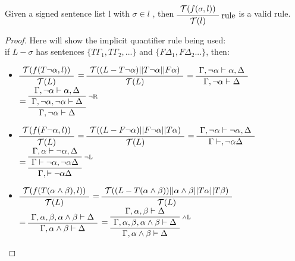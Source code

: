 \documentclass[runningheads]{llncs}
\begin{document}
\begin{theorem}
     Given a signed sentence list l with $\sigma \in l$ , then 
    $\RightLabel{rule}\AxiomC{$\mathcal{T}( f(\sigma,l))$}\UnaryInfC{$\mathcal{T}(l)$}\DisplayProof$ 
    is a valid rule.

\end{theorem}

\begin{proof}
    Here will show the implicit quantifier rule being used:\\ 
    if $L-\sigma$ has sentences $\{ T\Gamma_{1}, T\Gamma_{2}, ...\}$ and  $ \{F\Delta_1, F\Delta_2 ...\} $, then: 
    \small{
    \begin {itemize}

    \item
    $\AxiomC{$\mathcal{T}( f(T\neg \alpha,l))$}\UnaryInfC{$\mathcal{T}(L)$}\DisplayProof$ 
    $=\AxiomC{$\mathcal{T}( (L-T\neg \alpha)||T \neg \alpha||F \alpha)$}\UnaryInfC{$\mathcal{T}(L)$}\DisplayProof$
    $=\AxiomC{$\Gamma ,\neg \alpha \vdash \alpha, \Delta$}\UnaryInfC{$\Gamma, \neg \alpha \vdash \Delta$}\DisplayProof$ 
    $=\RightLabel{\scriptsize{$\neg$R}}\AxiomC{$\Gamma ,\neg \alpha \vdash \alpha, \Delta$}\UnaryInfC{$\Gamma, \neg \alpha , \neg \alpha \vdash \Delta$}\UnaryInfC{$\Gamma, \neg \alpha \vdash \Delta$}\DisplayProof$ 
    \item 
    $\AxiomC{$\mathcal{T}( f(F\neg \alpha,l))$}\UnaryInfC{$\mathcal{T}(L)$}\DisplayProof$ 
    $=\AxiomC{$\mathcal{T}( (L-F\neg \alpha)||F \neg \alpha||T \alpha)$}\UnaryInfC{$\mathcal{T}(L)$}\DisplayProof$
    $=\AxiomC{$\Gamma ,\neg \alpha \vdash \neg \alpha, \Delta$}\UnaryInfC{$\Gamma \vdash , \neg \alpha \Delta$}\DisplayProof$ 
    $=\RightLabel{\scriptsize{$\neg$L}}\AxiomC{$\Gamma , \alpha \vdash \neg \alpha, \Delta$}\UnaryInfC{$\Gamma \vdash \neg \alpha , \neg \alpha \Delta$}\UnaryInfC{$\Gamma,  \vdash  \neg \alpha \Delta$}\DisplayProof$ 
    \item 
    $\AxiomC{$\mathcal{T}( f(T(\alpha \land \beta),l))$}\UnaryInfC{$\mathcal{T}(L)$}\DisplayProof$ 
    $=\AxiomC{$\mathcal{T}( (L-T(\alpha \land \beta))||\alpha \land \beta||T \alpha||T \beta)$}\UnaryInfC{$\mathcal{T}(L)$}\DisplayProof$
    $=\AxiomC{$\Gamma ,\alpha, \beta, \alpha \land \beta \vdash \Delta$}\UnaryInfC{$\Gamma, \alpha \land \beta \vdash \Delta$}\DisplayProof$ 
    $=\RightLabel{\scriptsize{$\land$L}}\AxiomC{$\Gamma ,\alpha, \beta \vdash \Delta$}\UnaryInfC{$\Gamma, \alpha, \beta, \alpha \land \beta \vdash \Delta$}\UnaryInfC{$\Gamma, \alpha \land \beta \vdash \Delta$}\DisplayProof$

\end{itemize}}
\end{proof}
\end{document}
